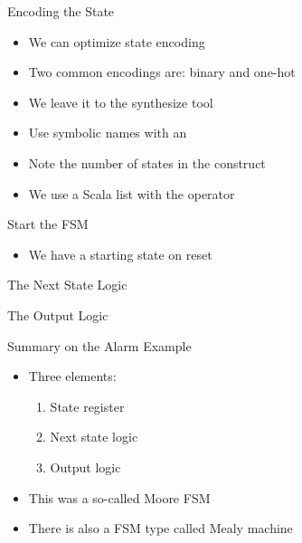 \begin{frame}[fragile]{Encoding the State}
\begin{itemize}
\item We can optimize state encoding
\item Two common encodings are: binary and one-hot
\item We leave it to the synthesize tool
\item Use symbolic names with an 
\item Note the number of states in the  construct
\item We use a Scala list with the \code{::} operator
\end{itemize}
\end{frame}

\begin{frame}[fragile]{Start the FSM}
\begin{itemize}
\item We have a starting state on reset
\end{itemize}
\end{frame}


\begin{frame}[fragile]{The Next State Logic}
\end{frame}

\begin{frame}[fragile]{The Output Logic}
\end{frame}

\begin{frame}[fragile]{Summary on the Alarm Example}
\begin{itemize}
\item Three elements:
\begin{enumerate}
\item State register
\item Next state logic
\item Output logic
\end{enumerate}
\item This was a so-called Moore FSM
\item There is also a FSM type called Mealy machine
\end{itemize}
\end{frame}

